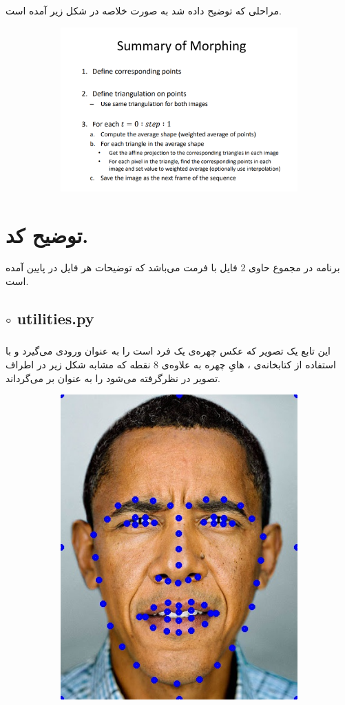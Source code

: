 \documentclass[a4paper,12pt]{article}
\begin{document}
مراحلی که توضیح داده شد به صورت خلاصه در شکل زیر آمده است.
\begin{figure}[H]
	\centering
	\begin{subfigure}{0.8\textwidth}
		\centering
		\includegraphics[width=.9\textwidth]{6.png}
	\end{subfigure}
\end{figure}
\section*{توضیح کد.}
برنامه در مجموع حاوی 2 فایل با فرمت
می‌باشد که توضیحات هر فایل در پایین آمده است.
\subsection*{$\circ$ utilities.py}
\subsubsection*{}
این تابع یک تصویر که عکس چهره‌ی یک فرد است را به عنوان ورودی می‌گیرد و با استفاده از کتابخانه‌ی 
،
‌هایِ
چهره به علاوه‌ی 8 نقطه که مشابه شکل زیر در اطراف تصویر در نظرگرفته می‌شود را به عنوان 
بر می‌گرداند. 
\begin{figure}[H]
	\centering
	\begin{subfigure}{0.6\textwidth}
		\centering
		\includegraphics[width=.5\textwidth]{6.jpg}
	\end{subfigure}
\end{figure}
\end{document}
